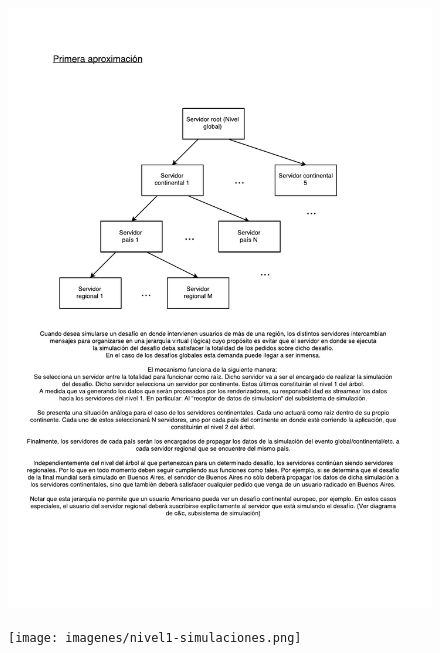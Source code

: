 \begin{figure}[H]
  \includegraphics[width=\textwidth, page=2, clip, trim=20 20 20 10]{imagenes/jerarquia-global.pdf}
\end{figure}

\begin{figure}[H]
  \centering
  \texttt{[image: imagenes/nivel1-simulaciones.png]}
\end{figure}
